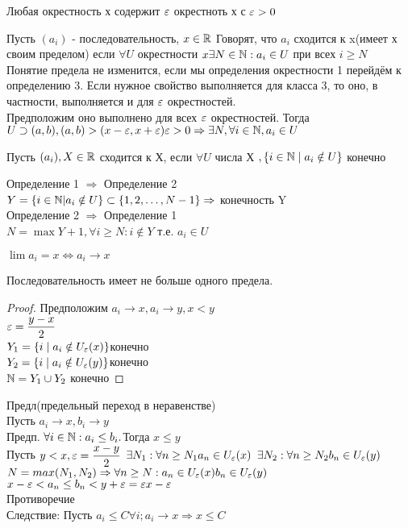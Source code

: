 Любая окрестность х содержит $\varepsilon $ окрестноть х с $ \varepsilon > 0 $ \\
\begin{definition}
	Пусть $(a_i)$ - последовательность, $ x \in \mathbb{R} $ Говорят, что $a_i$ сходится к x(имеет х своим пределом) если $ \forall U $ окрестности $x \exists N \in \mathbb{N} : a_i \in U $ при всех $ i \geq N $ \\
	Понятие предела не изменится, если мы определения окрестности 1 перейдём к определению 3. Если нужное свойство выполняется для класса 3, то оно, в частности, выполняется и для $ \varepsilon $ окрестностей. \\
	Предположим оно выполнено для всех $ \varepsilon $ окрестностей. Тогда $ U \supset(a, b), (a,b) > (x-\varepsilon, x+ \varepsilon) \varepsilon > 0 \Rightarrow \exists N, \forall i \in \mathbb{N}, a_i \in U$  \\
\end{definition}
\begin{definition}
	Пусть $(a_i), X \in \mathbb{R}$ сходится к Х, если $\forall U $ 	числа Х $, \{ i \in \mathbb{N} \mid a_i \notin U \} $ конечно 
\end{definition}
\noindent Определение 1 $\Rightarrow$ Определение 2 \\
$ Y = \{ i \in \mathbb{N} | a_i \notin U \} \subset \{ 1, 2, \dots, N - 1 \} \Rightarrow $ конечность Y \\
Определение 2 $\Rightarrow$ Определение 1 \\ 
$ N = \max Y + 1, \forall i \geq N : i \notin Y$ т.е. $ a_i \in U$
\begin{definition}
	$ \lim a_i = x  \Leftrightarrow a_i \rightarrow x $ \\
\end{definition}

Последовательность имеет не больше одного предела.
\begin{proof}
	Предположим $ a_i \rightarrow x, a_i \rightarrow y, x < y $ \\
	$ \varepsilon = \dfrac{y-x}{2} $ \\
	$Y_1 = \{ i \mid a_i \notin U_{\varepsilon} (x) \} $конечно\\
	$ Y_2 = \{ i \mid a_i \notin U_{\varepsilon} (y) \} $конечно\\
	$ \mathbb{N} = Y_1 \cup Y_2 $ конечно
\end{proof}



Предл(предельный переход в неравенстве) \\
Пусть $ a_i \rightarrow x, b_i \rightarrow y $ \\
Предп. $ \forall i \in \mathbb{N} : a_i \leq b_i. $Тогда $ x\leq y $ \\
Пусть $ y < x, \varepsilon = \dfrac{x-y}{2} $ 
$ \exists N_1 : \forall n \geq N_1 a_n \in U_{\varepsilon}(x) $
$ \exists N_2 : \forall n \geq N_2 b_n \in U_{\varepsilon}(y) $
$  N = max(N_1, N_2) \Rightarrow \forall n \geq N : 
a_n \in U_{\varepsilon}(x)\\
b_n \in U_{\varepsilon}(y)$\\
$ x- \varepsilon <  a_n \leq b_n < y+\varepsilon = \varepsilon x-\varepsilon$\\
Противоречие \\
Следствие: Пусть $ a_i \leq C \forall i; a_i \rightarrow x \Rightarrow x \leq C $\\


